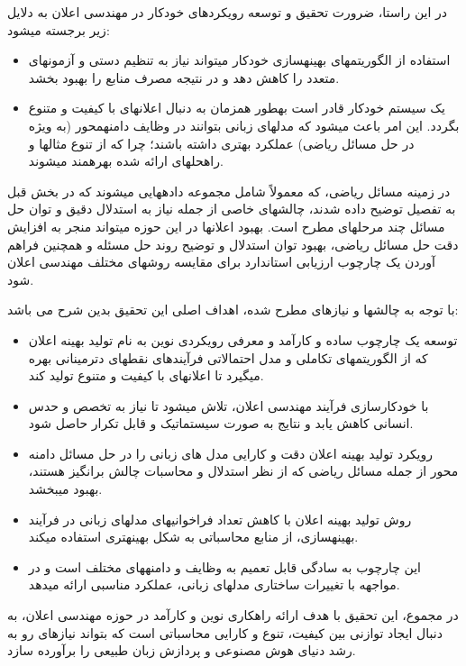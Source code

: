 در این راستا، ضرورت تحقیق و توسعه رویکردهای خودکار در مهندسی اعلان به دلایل زیر برجسته می\/شود:

\begin{itemize}
	\item استفاده از الگوریتم\/های بهینه\/سازی خودکار می\/تواند نیاز به تنظیم دستی و آزمون\/های متعدد را کاهش دهد و در نتیجه مصرف منابع را بهبود بخشد.
	\item یک سیستم خودکار قادر است به\/طور همزمان به دنبال اعلان\/های با کیفیت و متنوع بگردد. این امر باعث می\/شود که مدل\/های زبانی بتوانند در وظایف دامنه\/محور (به ویژه در حل مسائل ریاضی) عملکرد بهتری داشته باشند؛ چرا که از تنوع مثال\/ها و راه\/حل\/های ارائه شده بهره\/مند می\/شوند.
\end{itemize}


در زمینه مسائل ریاضی، که معمولاً شامل مجموعه داده\/هایی می\/شوند که در بخش قبل به تفصیل توضیح داده شدند، چالش\/های خاصی از جمله نیاز به استدلال دقیق و توان حل مسائل چند مرحله\/ای مطرح است. بهبود اعلان\/ها در این حوزه می\/تواند منجر به افزایش دقت حل مسائل ریاضی، بهبود توان استدلال و توضیح روند حل مسئله و همچنین فراهم آوردن یک چارچوب ارزیابی استاندارد برای مقایسه روش\/های مختلف مهندسی اعلان شود.



با توجه به چالش\/ها و نیازهای مطرح شده، اهداف اصلی این تحقیق بدین شرح می باشد:
\begin{itemize}
	\item توسعه یک چارچوب ساده و کارآمد و معرفی رویکردی نوین به نام تولید بهینه اعلان
	 که از الگوریتم\/های تکاملی و مدل احتمالاتی فرآیندهای نقطه\/ای دترمینانی بهره می\/گیرد تا اعلان\/های با کیفیت و متنوع تولید کند.
	\item با خودکارسازی فرآیند مهندسی اعلان، تلاش می\/شود تا نیاز به تخصص و حدس انسانی کاهش یابد و نتایج به صورت سیستماتیک و قابل تکرار حاصل شود.
	\item 
	رویکرد تولید بهینه اعلان دقت و کارایی مدل های زبانی را در حل مسائل دامنه محور از جمله مسائل ریاضی که از نظر استدلال و محاسبات چالش برانگیز هستند، بهبود می\/بخشد.
	\item 
	روش تولید بهینه اعلان با کاهش تعداد فراخوانی\/های مدل\/های زبانی در فرآیند بهینه\/سازی، از منابع محاسباتی به شکل بهینه\/تری استفاده می\/کند.
	\item  این چارچوب به سادگی قابل تعمیم به وظایف و دامنه\/های مختلف است و در مواجهه با تغییرات ساختاری مدل\/های زبانی، عملکرد مناسبی ارائه می\/دهد.
\end{itemize}

در مجموع، این تحقیق با هدف ارائه راهکاری نوین و کارآمد در حوزه مهندسی اعلان، به دنبال ایجاد توازنی بین کیفیت، تنوع و کارایی محاسباتی است که بتواند نیازهای رو به رشد دنیای هوش مصنوعی و پردازش زبان طبیعی را برآورده سازد.

